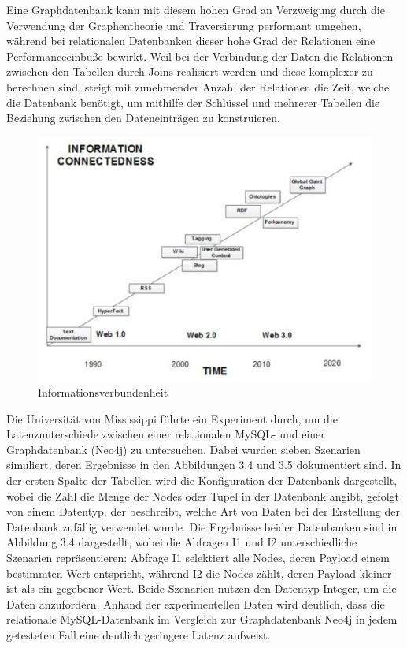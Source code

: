 \noindent
Eine Graphdatenbank kann mit diesem hohen Grad an Verzweigung durch die Verwendung der Graphentheorie und Traversierung performant umgehen, während bei relationalen Datenbanken dieser hohe Grad der Relationen eine Performanceeinbuße bewirkt. Weil bei der Verbindung der Daten die Relationen zwischen den Tabellen durch Joins realisiert werden und diese komplexer zu berechnen sind, steigt mit zunehmender Anzahl der Relationen die Zeit, welche die Datenbank benötigt, um mithilfe der Schlüssel und mehrerer Tabellen die Beziehung zwischen den Dateneinträgen zu konstruieren.  \citep{9677042} \citep{graphdb}
\begin{figure}[H]
	\centering
	\includegraphics[scale=.45]{Illustrations/informationconnectedness.png}
	\caption{Informationsverbundenheit \citep{performancenosql}}
\end{figure}
\noindent
Die Universität von Mississippi führte ein Experiment durch, um die Latenzunterschiede zwischen einer relationalen MySQL- und einer Graphdatenbank (Neo4j) zu untersuchen. Dabei wurden sieben Szenarien simuliert, deren Ergebnisse in den Abbildungen 3.4 und 3.5 dokumentiert sind. In der ersten Spalte der Tabellen wird die Konfiguration der Datenbank dargestellt, wobei die Zahl die Menge der Nodes oder Tupel in der Datenbank angibt, gefolgt von einem Datentyp, der beschreibt, welche Art von Daten bei der Erstellung der Datenbank zufällig verwendet wurde. Die Ergebnisse beider Datenbanken sind in Abbildung 3.4 dargestellt, wobei die Abfragen I1 und I2 unterschiedliche Szenarien repräsentieren: Abfrage I1 selektiert alle Nodes, deren Payload einem bestimmten Wert entspricht, während I2 die Nodes zählt, deren Payload kleiner ist als ein gegebener Wert. Beide Szenarien nutzen den Datentyp Integer, um die Daten anzufordern. Anhand der experimentellen Daten wird deutlich, dass die relationale MySQL-Datenbank im Vergleich zur Graphdatenbank Neo4j in jedem getesteten Fall eine deutlich geringere Latenz aufweist. 
